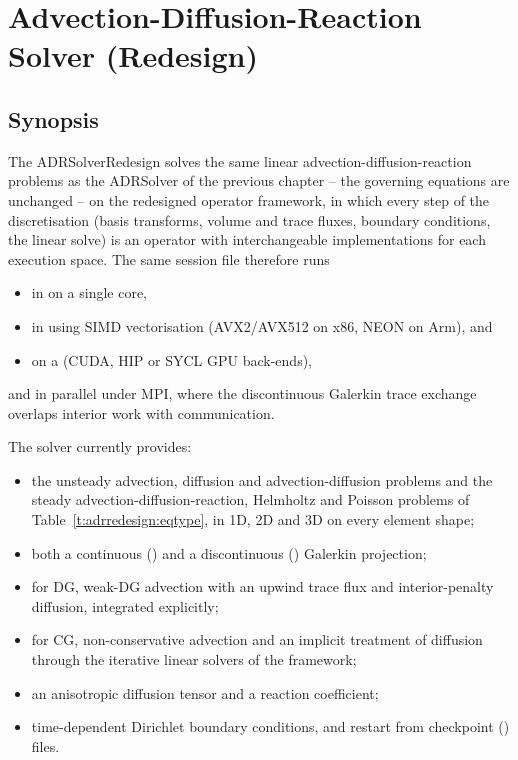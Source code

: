 \chapter{Advection-Diffusion-Reaction Solver (Redesign)}
\label{chap:adrRedesign}

\section{Synopsis}
The ADRSolverRedesign solves the same linear advection-diffusion-reaction
problems as the ADRSolver of the previous chapter -- the governing equations
are unchanged -- on the redesigned operator framework, in which every step of
the discretisation (basis transforms, volume and trace fluxes, boundary
conditions, the linear solve) is an operator with interchangeable
implementations for each execution space. The same session file therefore runs

\begin{itemize}
\item in  on a single core,
\item in  using SIMD vectorisation (AVX2/AVX512 on x86, NEON on
  Arm), and
\item on a  (CUDA, HIP or SYCL GPU back-ends),
\end{itemize}

and in parallel under MPI, where the discontinuous Galerkin trace exchange
overlaps interior work with communication.

The solver currently provides:

\begin{itemize}
\item the unsteady advection, diffusion and advection-diffusion problems
  and the steady advection-diffusion-reaction, Helmholtz and Poisson
  problems of Table~\ref{t:adrredesign:eqtype}, in 1D, 2D and 3D on every
  element shape;
\item both a continuous () and a discontinuous
  () Galerkin projection;
\item for DG, weak-DG advection with an upwind trace flux and interior-penalty
  diffusion, integrated explicitly;
\item for CG, non-conservative advection and an implicit treatment of
  diffusion through the iterative linear solvers of the framework;
\item an anisotropic diffusion tensor and a reaction coefficient;
\item time-dependent Dirichlet boundary conditions, and restart from
  checkpoint () files.
\end{itemize}

